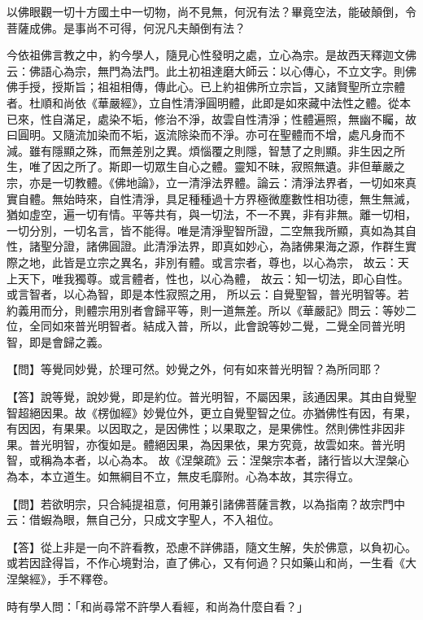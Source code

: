 {\kaishu 以佛眼觀一切十方國土中一切物，尚不見無，何況有法？畢竟空法，能破顛倒，令菩薩成佛。是事尚不可得，何況凡夫顛倒有法？}

今依祖佛言教之中，約今學人，隨見心性發明之處，立心為宗。是故西天釋迦文佛云：佛語心為宗，無門為法門。此土初祖達磨大師云：{\kaishu 以心傳心，不立文字。則佛佛手授，授斯旨；祖祖相傳，傳此心}。已上約祖佛所立宗旨，又諸賢聖所立宗體者。杜順和尚依《華嚴經》，{\kaishu 立自性清淨圓明體，此即是如來藏中法性之體}。從本已來，性自滿足，處染不垢，修治不淨，故雲自性清淨；性體遍照，無幽不矚，故曰圓明。又隨流加染而不垢，返流除染而不淨。亦可在聖體而不增，處凡身而不減。雖有隱顯之殊，而無差別之異。煩惱覆之則隱，智慧了之則顯。非生因之所生，唯了因之所了。斯即一切眾生自心之體。靈知不昧，寂照無遺。非但華嚴之宗，亦是一切教體。《佛地論》，立一清淨法界體。論云：清淨法界者，一切如來真實自體。無始時來，自性清淨，具足種種過十方界極微塵數性相功德，無生無滅，猶如虛空，遍一切有情。平等共有，與一切法，不一不異，非有非無。離一切相，一切分別，一切名言，皆不能得。唯是清淨聖智所證，二空無我所顯，真如為其自性，諸聖分證，諸佛圓證。此清淨法界，即真如妙心，為諸佛果海之源，作群生實際之地，此皆是立宗之異名，非別有體。或言宗者，尊也，以心為宗，
故云：{\kaishu 天上天下，唯我獨尊。}或言體者，性也，以心為體，
故云：{\kaishu 知一切法，即心自性}。或言智者，以心為智，即是本性寂照之用，
所以云：{\kaishu 自覺聖智，普光明智等}。若約義用而分，則體宗用別者會歸平等，則一道無差。所以《華嚴記》問云：等妙二位，全同如來普光明智者。結成入普，所以，此會說等妙二覺，二覺全同普光明智，即是會歸之義。
 
{\heiti 【問】等覺同妙覺，於理可然。妙覺之外，何有如來普光明智？為所同耶？ }

【答】說等覺，說妙覺，即是約位。普光明智，不屬因果，該通因果。其由自覺聖智超絕因果。故《楞伽經》妙覺位外，更立自覺聖智之位。亦猶佛性有因，有果，有因因，有果果。以因取之，是因佛性；以果取之，是果佛性。然則佛性非因非果。普光明智，亦復如是。體絕因果，為因果依，果方究竟，故雲如來。普光明智，或稱為本者，以心為本。
故《涅槃疏》云：{\kaishu 涅槃宗本者，諸行皆以大涅槃心為本，本立道生。如無綱目不立，無皮毛靡附。心為本故，其宗得立}。 


{\heiti 【問】若欲明宗，只合純提祖意，何用兼引諸佛菩薩言教，以為指南？故宗門中云：借蝦為眼，無自己分，只成文字聖人，不入祖位。 }

【答】從上非是一向不許看教，恐慮不詳佛語，隨文生解，失於佛意，以負初心。或若因詮得旨，不作心境對治，直了佛心，又有何過？只如藥山和尚，一生看《大涅槃經》，手不釋卷。

時有學人問：「和尚尋常不許學人看經，和尚為什麼自看？」

